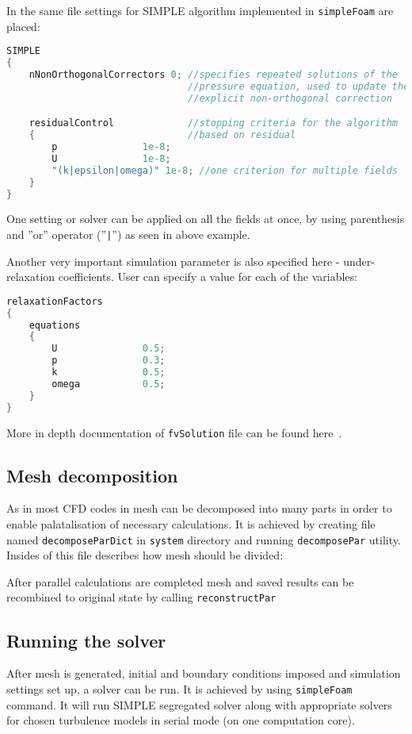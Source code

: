             In the same file settings for SIMPLE algorithm implemented in \texttt{simpleFoam} are placed:
            \begin{lstlisting}[language=C++]
SIMPLE
{
    nNonOrthogonalCorrectors 0; //specifies repeated solutions of the 
                                //pressure equation, used to update the
                                //explicit non-orthogonal correction

    residualControl             //stopping criteria for the algorithm 
    {                           //based on residual
        p               1e-8;
        U               1e-8;
        "(k|epsilon|omega)" 1e-8; //one criterion for multiple fields
    }
}
            \end{lstlisting}
            One setting or solver can be applied on all the fields at once, by using parenthesis and ''or'' operator (''\texttt{|}'') as seen in above example. 
            
            Another very important simulation parameter is also specified here - under-relaxation coefficients. User can specify a value for each of the variables:
            \begin{lstlisting}[language=C++]
relaxationFactors
{
    equations
    {
        U               0.5;
        p               0.3;
        k               0.5;
        omega           0.5;
    }
}
            \end{lstlisting}
            More in depth documentation of \texttt{fvSolution} file can be found here~\cite{fvSolution}.
        \subsection{Mesh decomposition}
            As in most CFD codes in \oFoam mesh can be decomposed into many parts in order to enable palatalisation of necessary calculations.
            It is achieved by creating file named \texttt{decomposeParDict} in \texttt{system} directory and running \texttt{decomposePar} utility. Insides of this file describes how mesh should be divided:
            
            After parallel calculations are completed mesh and saved results can be recombined to original state by calling \texttt{reconstructPar}
        \subsection{Running the solver}
            After mesh is generated, initial and boundary conditions imposed and simulation settings set up, a solver can be run. It is achieved by using \texttt{simpleFoam} command. It will run SIMPLE segregated solver along with appropriate solvers for chosen turbulence models in serial mode (on one computation core).


